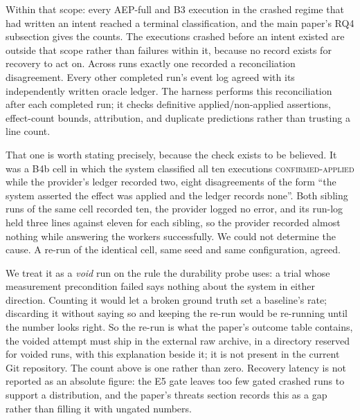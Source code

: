 \documentclass[10pt,journal,compsoc]{IEEEtran}
\begin{document}
Within that scope: every AEP-full and B3 execution in the crashed regime that
had written an intent reached a terminal classification, and the main paper's
RQ4 subsection gives the counts. The executions crashed before an intent
existed are outside that scope rather than failures within it, because no
record exists for recovery to act on. Across \RunsCollected{} runs exactly
one recorded a reconciliation disagreement. Every other completed run's
event log agreed with its independently written oracle ledger. The harness
performs this reconciliation after each completed run; it checks definitive
applied/non-applied assertions, effect-count bounds, attribution, and duplicate
predictions rather than trusting a line count.

That one is worth stating precisely, because the check exists to be believed.
It was a B4b cell in which the system classified all ten executions
\textsc{confirmed-applied} while the provider's ledger recorded two, eight
disagreements of the form ``the system asserted the effect was applied and the
ledger records none''. Both sibling runs of the same cell recorded ten, the
provider logged no error, and its run-log held three lines against eleven for
each sibling, so the provider recorded almost nothing while answering the
workers successfully. We could not determine the cause. A re-run of the
identical cell, same seed and same configuration, agreed.

We treat it as a \emph{void} run on the rule the durability probe uses: a
trial whose measurement precondition failed says nothing about the system in
either direction. Counting it would let a broken ground truth set a baseline's
rate; discarding it without saying so and keeping the re-run would be
re-running until
the number looks right. So the re-run is what the paper's outcome table contains,
the voided attempt must ship in the external raw archive, in a
directory reserved for voided runs, with this explanation beside it; it is not
present in the current Git repository. The count above is one rather than zero.
Recovery latency is not reported as an absolute figure: the E5 gate leaves too
few gated crashed runs to support a distribution, and the paper's threats section
records this as a gap rather than filling it with ungated numbers.


\end{document}
